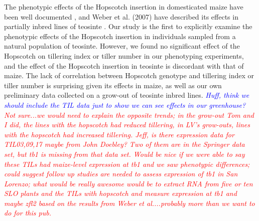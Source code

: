 \documentclass[12pt]{article}
\newcommand{\jri}[1]{\textcolor{blue}{ \emph{\scriptsize  #1}} }
\newcommand{\mbh}[1]{\textcolor{red}{ \emph{\scriptsize  #1}} }
\begin{document}
The phenotypic effects of the Hopscotch insertion in domesticated maize have been well documented \cite{Clark et al 2006, Studer et al 2011}, and Weber et al. (2007) have described its effects in partially inbred lines of teosinte \cite{Weber et al 2007}. Our study is the first to explicitly examine the phenotypic effects of the Hopscotch insertion in individuals sampled from a natural population of teosinte. However, we found no significant effect of the Hopscotch on tillering index or tiller number in our phenotyping experiments, and the effect of the Hopscotch insertion in teosinte is discordant with that of maize. The lack of correlation between Hopscotch genotype and tillering index or tiller number is surprising given its effects in maize, as well as our own preliminary data collected on a grow-out of teosinte inbred lines. \jri{Huff, think we should include the TIL data just to show we can see effects in our greenhouse?} \mbh{Not sure...we would need to explain the opposite trends; in the grow-out Tom and I did, the lines with the hopscotch had reduced tillering, in LV's grow-outs, lines with the hopscotch had increased tillering.  Jeff, is there expression data for TIL03,09,17 maybe from John Doebley?  Two of them are in the Springer data set, but tb1 is missing from that data set.  Would be nice if we were able to say these TILs had maize-level expression at tb1 and we saw phenotypic differences; could suggest follow up studies are needed to assess expression of tb1 in San Lorenzo; what would be really awesome would be to extract RNA from five or ten SLO plants and the TILs with hopscotch and measure expression at tb1 and maybe zfl2 based on the results from Weber et al....probably more than we want to do for this pub.}
\end{document}
